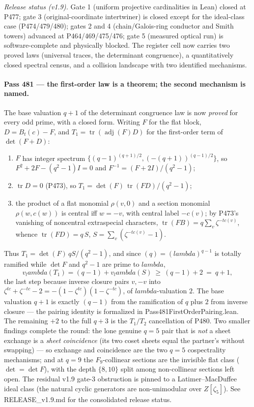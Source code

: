 \documentclass[12pt,a4paper]{article}
\def\mathbb#1{#1}%
\def\textbf#1{#1}%
\def\texttt#1{#1}%
\def\lambda{lambda}%
\theoremstyle{definition}
\newcommand{\FF}{\mathbb{F}}
\newcommand{\ZZ}{\mathbb{Z}}
\begin{document}
\medskip\noindent\emph{Release status (v1.9).}  Gate 1 (uniform projective
cardinalities in Lean) closed at P477; gate 3 (original-coordinate
intertwiner) is closed except for the ideal-class case (P474/479/480); gates
2 and 4 (chain/Galois-ring conductor and Smith towers) advanced at
P464/469/475/476; gate 5 (measured optical run) is software-complete and
physically blocked.  The register cell now carries two proved laws (universal
traces, the determinant congruence), a quantitatively closed spectral census,
and a collision landscape with two identified mechanisms.

\paragraph{Pass 481 --- the first-order law is a theorem; the second mechanism
is named.}
The base valuation $q{+}1$ of the determinant congruence law is now
\emph{proved} for every odd prime, with a closed form.  Writing $F$ for the
flat block, $D=B_t(c)-F$, and $T_1=\operatorname{tr}(\operatorname{adj}(F)D)$
for the first-order term of $\det(F+D)$:
\begin{enumerate}
\item $F$ has integer spectrum $\{(q{-}1)^{(q+1)/2},(-(q{+}1))^{(q-1)/2}\}$,
so $F^2+2F-(q^2{-}1)I=0$ and $F^{-1}=(F+2I)/(q^2{-}1)$;
\item $\operatorname{tr}D=0$ (P473), so
$T_1=\det(F)\,\operatorname{tr}(FD)/(q^2{-}1)$;
\item the product of a flat monomial $\rho(v,0)$ and a section monomial
$\rho(w,c(w))$ is central iff $w=-v$, with central label $-c(v)$; by P473's
vanishing of noncentral extraspecial characters,
$\operatorname{tr}(FB)=q\sum_v\zeta^{-tc(v)}$, whence
$\operatorname{tr}(FD)=q\,S$, $S=\sum_v(\zeta^{-tc(v)}-1)$.
\end{enumerate}
Thus $T_1=\det(F)\,qS/(q^2{-}1)$, and since $(q)=(\lambda)^{q-1}$ is totally
ramified while $\det F$ and $q^2{-}1$ are prime to $\lambda$,
\[
v_\lambda(T_1)=(q{-}1)+v_\lambda(S)\ \ge\ (q{-}1)+2\ =\ q{+}1,
\]
the last step because inverse closure pairs $v,-v$ into
$\zeta^{tc}+\zeta^{-tc}-2=-(1-\zeta^{tc})(1-\zeta^{-tc})$, of
$\lambda$-valuation $2$.  \textbf{The base valuation $q{+}1$ is exactly
$(q{-}1)$ from the ramification of $q$ plus $2$ from inverse closure} --- the
pairing identity is formalized in \texttt{Pass481FirstOrderPairing.lean}.  The
remaining $+2$ to the full $q{+}3$ is the $T_1/T_2$ cancellation of P480.
Two smaller findings complete the round: the lone genuine $q=5$ pair that is
\emph{not} a sheet exchange is a \emph{sheet coincidence} (its two coset
sheets equal the partner's without swapping) --- so exchange and coincidence
are the two $q=5$ cospectrality mechanisms; and at $q=9$ the $\FF_9$-collinear
sections are the invisible flat class ($\det=\det F$), with the depth
$\{8,10\}$ split among non-collinear sections left open.  The residual v1.9
gate-3 obstruction is pinned to a Latimer--MacDuffee ideal class (the natural
cyclic generators are non-unimodular over $\ZZ[\zeta_5]$).  See
\texttt{RELEASE\_v1.9.md} for the consolidated release status.
\end{document}
